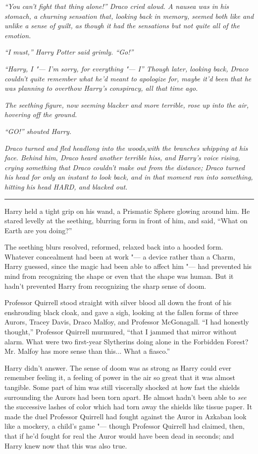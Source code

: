 \emph{``You can't fight that thing alone!'' Draco cried aloud. A nausea
was in his stomach, a churning sensation that, looking back in memory,
seemed both like and unlike a sense of guilt, as though it had the
sensations but not quite all of the emotion.}

\emph{``I must,'' Harry Potter said grimly. ``Go!''}

\emph{``Harry, I "--- I'm sorry, for everything "--- I'' Though later, looking
back, Draco couldn't quite remember what he'd meant to apologize for,
maybe it'd been that he was planning to overthow Harry's conspiracy, all
that time ago.}

\emph{The seething figure, now seeming blacker and more terrible, rose
up into the air, hovering off the ground.}

\emph{``GO!'' shouted Harry.}

\emph{Draco turned and fled headlong into the woods,with the branches
whipping at his face. Behind him, Draco heard another terrible hiss, and
Harry's voice rising, crying something that Draco couldn't make out from
the distance; Draco turned his head for only an instant to look back,
and in that moment ran into something, hitting his head HARD, and
blacked out.}

\begin{center}\rule{3in}{0.4pt}\end{center}

Harry held a tight grip on his wand, a Prismatic Sphere glowing around
him. He stared levelly at the seething, blurring form in front of him,
and said, ``What on Earth are you doing?''

The seething blurs resolved, reformed, relaxed back into a hooded form.
Whatever concealment had been at work "--- a device rather than a Charm,
Harry guessed, since the magic had been able to affect him "--- had
prevented his mind from recognizing the shape or even that the shape was
human. But it hadn't prevented Harry from recognizing the sharp sense of
doom.

Professor Quirrell stood straight with silver blood all down the front
of his enshrouding black cloak, and gave a sigh, looking at the fallen
forms of three Aurors, Tracey Davis, Draco Malfoy, and Professor
McGonagall. ``I had honestly thought,'' Professor Quirrell murmured,
``that I jammed that mirror without alarm. What were two first-year
Slytherins doing alone in the Forbidden Forest? Mr. Malfoy has more
sense than this... What a fiasco.''

Harry didn't answer. The sense of doom was as strong as Harry could ever
remember feeling it, a feeling of power in the air so great that it was
almost tangible. Some part of him was still viscerally shocked at how
fast the shields surrounding the Aurors had been torn apart. He almost
hadn't been able to \emph{see} the successive lashes of color which had
torn away the shields like tissue paper. It made the duel Professor
Quirrell had fought against the Auror in Azkaban look like a mockery, a
child's game "--- though Professor Quirrell had claimed, then, that if he'd
fought for real the Auror would have been dead in seconds; and Harry
knew now that this was also true.

